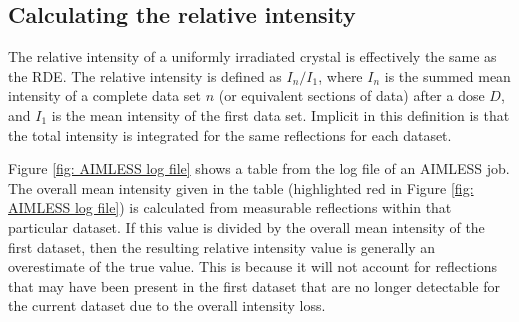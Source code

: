 \subsection{Calculating the relative intensity}
\label{sub:Calculating the relative intensity}
The relative intensity of a uniformly irradiated crystal is effectively the same as the RDE.
The relative intensity is defined as $I_n/I_1$, where $I_n$ is the summed mean intensity of a complete data set $n$ (or equivalent sections of data) after a dose $D$, and $I_1$ is the mean intensity of the first data set.
Implicit in this definition is that the total intensity is integrated for the same reflections for each dataset.

Figure \ref{fig: AIMLESS log file} shows a table from the log file of an AIMLESS job.
The overall mean intensity given in the table (highlighted red in Figure \ref{fig: AIMLESS log file}) is calculated from measurable reflections within that particular dataset.
If this value is divided by the overall mean intensity of the first dataset, then the resulting relative intensity value is generally an overestimate of the true value.
This is because it will not account for reflections that may have been present in the first dataset that are no longer detectable for the current dataset due to the overall intensity loss.

